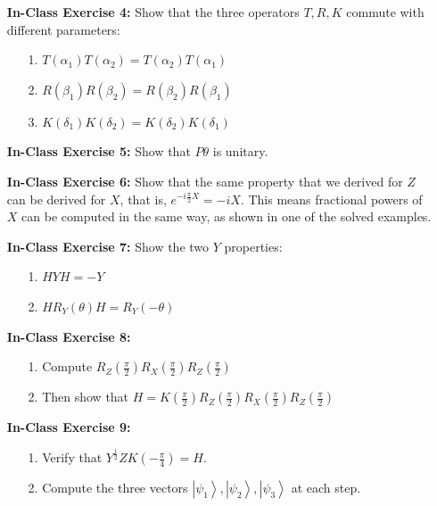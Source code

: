 \documentclass[main.tex]{subfiles}
\begin{document}
\begin{enumerate}
\item[] \textbf{In-Class Exercise 4:} Show that the three operators $T, R, K$ commute with different parameters:
\begin{enumerate}
    \item [1.] $T\left(\alpha_{1}\right) T\left(\alpha_{2}\right)=T\left(\alpha_{2}\right) T\left(\alpha_{1}\right)$
    \item [2.] $R\left(\beta_{1}\right) R\left(\beta_{2}\right)=R\left(\beta_{2}\right) R\left(\beta_{1}\right)$
    \item [3.] $K\left(\delta_{1}\right) K\left(\delta_{2}\right)=K\left(\delta_{2}\right) K\left(\delta_{1}\right)$ 
\end{enumerate}

\item[] \textbf{In-Class Exercise 5:} Show that $P\theta$ is unitary. 

\item[] \textbf{In-Class Exercise 6:} Show that the same property that we derived for $Z$ can be derived for $X$, that is, $e^{-i \frac{\pi}{2} X}=-i X$. This means fractional powers of $X$ can be computed in the same way, as shown in one of the solved examples.

\item[] \textbf{In-Class Exercise 7:} Show the two $Y$ properties:
\begin{enumerate}
    \item [1.] $H Y H=-Y$
    \item [2.] $H R_{Y}(\theta) H=R_{Y}(-\theta)$
\end{enumerate}

\item[] \textbf{In-Class Exercise 8:} 
\begin{enumerate}
    \item [1.]  Compute $R_{Z}\left(\frac{\pi}{2}\right) R_{X}\left(\frac{\pi}{2}\right) R_{Z}\left(\frac{\pi}{2}\right)$
    \item [2.] Then show that $H=K\left(\frac{\pi}{2}\right) R_{Z}\left(\frac{\pi}{2}\right) R_{X}\left(\frac{\pi}{2}\right) R_{Z}\left(\frac{\pi}{2}\right)$
\end{enumerate}

\item[] \textbf{In-Class Exercise 9:} 
\begin{enumerate}
    \item [1.] Verify that $Y^{\frac{1}{2}} Z K\left(-\frac{\pi}{4}\right)=H$.
    \item [2.] Compute the three vectors $\left|\psi_{1}\right\rangle,\left|\psi_{2}\right\rangle,\left|\psi_{3}\right\rangle$ at each step.
\end{enumerate}


\end{enumerate}
\end{document}
